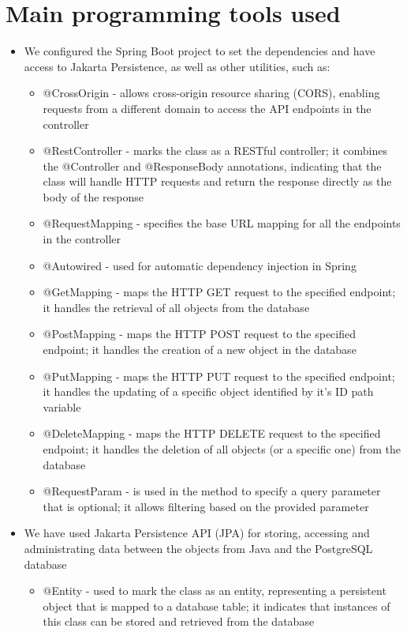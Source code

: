 \documentclass{article}
\begin{document}
\section{Main programming tools used}
\begin{itemize}
    \item We configured the Spring Boot project to set the dependencies and have access to Jakarta Persistence, as well as other utilities, such as:
    \begin{itemize}
        \item @CrossOrigin - allows cross-origin resource sharing (CORS), enabling requests from a different domain to access the API endpoints in the controller
        \item @RestController - marks the class as a RESTful controller; it combines the @Controller and @ResponseBody annotations, indicating that the class will handle HTTP requests and return the response directly as the body of the response
        \item @RequestMapping - specifies the base URL mapping for all the endpoints in the controller
        \item @Autowired - used for automatic dependency injection in Spring
        \item @GetMapping - maps the HTTP GET request to the specified endpoint; it handles the retrieval of all objects from the database
        \item @PostMapping - maps the HTTP POST request to the specified endpoint; it handles the creation of a new object in the database
        \item @PutMapping - maps the HTTP PUT request to the specified endpoint; it handles the updating of a specific object identified by it's ID path variable
        \item @DeleteMapping - maps the HTTP DELETE request to the specified endpoint; it handles the deletion of all objects (or a specific one) from the database
        \item @RequestParam - is used in the method to specify a query parameter that is optional; it allows filtering based on the provided parameter
    \end{itemize}
    \item We have used Jakarta Persistence API (JPA) for storing, accessing and administrating data between the objects from Java and the PostgreSQL database
    \begin{itemize}
        \item @Entity - used to mark the class as an entity, representing a persistent object that is mapped to a database table; it indicates that instances of this class can be stored and retrieved from the database

\end{itemize}
\end{itemize}
\end{document}

